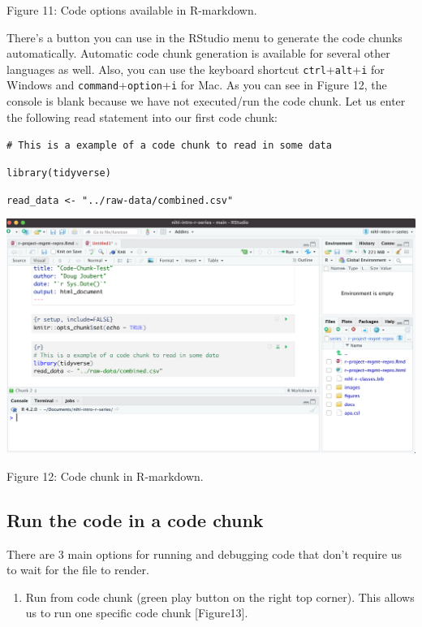 \documentclass[
]{article}
\providecommand{\tightlist}{%
  \setlength{\itemsep}{0pt}\setlength{\parskip}{0pt}}
\begin{document}
Figure 11: Code options available in R-markdown.

There's a button you can use in the RStudio menu to generate the code
chunks automatically. Automatic code chunk generation is available for
several other languages as well. Also, you can use the keyboard shortcut
\texttt{ctrl}+\texttt{alt}+\texttt{i} for Windows and
\texttt{command}+\texttt{option}+\texttt{i} for Mac. As you can see in
Figure 12, the console is blank because we have not executed/run the
code chunk. Let us enter the following read statement into our first
code chunk:

\texttt{\#\ This\ is\ a\ example\ of\ a\ code\ chunk\ to\ read\ in\ some\ data}

\texttt{library(tidyverse)}

\texttt{read\_data\ \textless{}-\ "../raw-data/combined.csv"}

\includegraphics[width=6.5in,height=\textheight]{images/code-chunk-script.png}

Figure 12: Code chunk in R-markdown.

\hypertarget{run-the-code-in-a-code-chunk}{%
\subsection{Run the code in a code
chunk}\label{run-the-code-in-a-code-chunk}}

There are 3 main options for running and debugging code that don't
require us to wait for the file to render.

\begin{enumerate}
\def\labelenumi{\arabic{enumi})}
\tightlist
\item
  Run from code chunk (green play button on the right top corner). This
  allows us to run one specific code chunk {[}Figure13{]}.
\end{enumerate}
\end{document}
